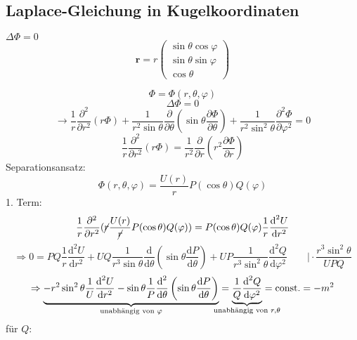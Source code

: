 \documentclass[titlepage,11pt,a4paper,ngerman]{report}
\newcommand{\tx}[1]{\textrm{#1}}
\newcommand{\const}{\tx{const.}}
\newcommand{\prt}[2]{\frac{\partial #1}{\partial #2}}
\renewcommand{\Phi}{\varPhi}
\renewcommand{\vec}[1]{\boldsymbol{#1}}
\begin{document}
\subsection{Laplace-Gleichung in Kugelkoordinaten}

$ \Delta \Phi = 0 $ 
\begin{equation*}
\vec{r} = r \begin{pmatrix}
\sin \theta \cos \varphi \\ \sin \theta \sin \varphi \\ \cos \theta
\end{pmatrix}
\end{equation*}

$$\Phi = \Phi(r,\theta, \varphi)$$
$$\Delta \Phi = 0$$
$$\rightarrow \frac{1}{r} \prt{^2}{r^2}(r \Phi) + \frac{1}{r^2 \sin \theta} \prt{}{\theta} \left( \sin \theta \prt{\Phi}{\theta}\right) + \frac{1}{r^2 \sin^2 \theta} \prt{^2 \Phi}{\varphi^2} = 0$$
$$\frac{1}{r} \prt{^2}{r^2} (r \Phi) = \frac{1}{r^2} \prt{}{r} \left(r^2 \prt{\Phi}{r}\right)$$
Separationsansatz:
$$\Phi(r,\theta,\varphi) = \frac{U(r)}{r} P(\cos\theta)Q(\varphi)$$
1. Term:
$$\frac{1}{r} \prt{^2}{r^2} (\cancel{r} \frac{U(r)}{\cancel{r}} P(\cos\theta)Q(\varphi)) = P(\cos\theta)Q(\varphi)\frac{1}{r}\frac{\textrm{d}^2 U}{\textrm{d} r^2}$$
$$\Rightarrow 0 = PQ \frac{1}{r} \frac{\textrm{d}^2 U}{\textrm{d} r^2} + UQ \frac{1}{r^3 \sin \theta}\frac{\textrm{d}}{\textrm{d}\theta} \left(\sin\theta \frac{\textrm{d} P}{\textrm{d} \theta} \right) + UP \frac{1}{r^3 \sin^2 \theta} \frac{\textrm{d}^2 Q}{\textrm{d} \varphi^2} \qquad \bigg\rvert \cdot \frac{r^3 \sin^2 \theta}{UPQ}$$
$$\Rightarrow \underbrace{- r^2 \sin^2 \theta \frac{1}{U} \frac{\textrm{d}^2 U}{\textrm{d} r^2} - \sin \theta \frac{1}{P}\frac{\textrm{d}^2}{\textrm{d} \theta}\left( \sin \theta \frac{\textrm{d} P}{\textrm{d} \theta} \right)}_{\textrm{unabhängig von } \varphi} = \underbrace{\frac{1}{Q} \frac{\textrm{d}^2 Q}{\textrm{d} \varphi^2}}_{\mathclap{\textrm{unabhängig von }r,\theta}} = \const = -m^2$$
für $Q$:
\end{document}

